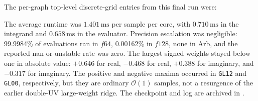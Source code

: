 \documentclass[11pt]{article}
\begin{document}
The per-graph top-level discrete-grid entries from this final run were:
\begin{center}
\scriptsize
{}
\end{center}

The average runtime was \(1.401\,\mathrm{ms}\) per sample per core, with
\(0.710\,\mathrm{ms}\) in the integrand and \(0.658\,\mathrm{ms}\) in the
evaluator.  Precision escalation was negligible: 99.9984\% of evaluations ran
in \(f64\), 0.00162\% in \(f128\), none in Arb, and the reported
nan-or-unstable rate was zero.  The largest signed weights stayed below one in
absolute value:
\(+0.646\) for real, \(-0.468\) for real, \(+0.388\) for imaginary, and
\(-0.317\) for imaginary.  The positive and negative maxima occurred in
\texttt{GL12} and \texttt{GL00}, respectively, but they are ordinary
\(\mathcal{O}(1)\) samples, not a resurgence of the earlier double-UV
large-weight ridge.  The checkpoint and log are archived in
.
\end{document}
